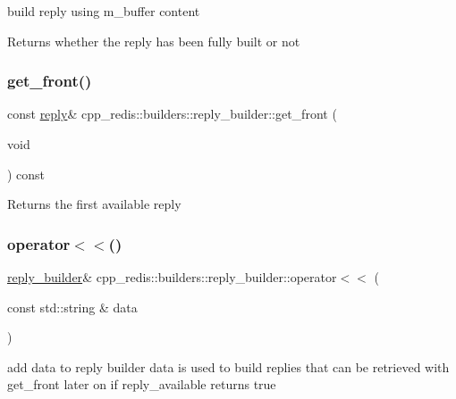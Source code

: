 build reply using m\+\_\+buffer content

\begin{DoxyReturn}{Returns}
whether the reply has been fully built or not 
\end{DoxyReturn}
\mbox{\label{classcpp__redis_1_1builders_1_1reply__builder_ac37b532920ace20e24a40ea1c61940fe}} 
\subsubsection{\texorpdfstring{get\+\_\+front()}{get\_front()}}
{\footnotesize\ttfamily const \hyperlink{classcpp__redis_1_1reply}{reply}\& cpp\+\_\+redis\+::builders\+::reply\+\_\+builder\+::get\+\_\+front (\begin{DoxyParamCaption}\item[{void}]{ }\end{DoxyParamCaption}) const}

\begin{DoxyReturn}{Returns}
the first available reply 
\end{DoxyReturn}
\mbox{\label{classcpp__redis_1_1builders_1_1reply__builder_a5f675e309a7a6002d582293c6410c967}} 
\subsubsection{\texorpdfstring{operator$<$$<$()}{operator<<()}}
{\footnotesize\ttfamily \hyperlink{classcpp__redis_1_1builders_1_1reply__builder}{reply\+\_\+builder}\& cpp\+\_\+redis\+::builders\+::reply\+\_\+builder\+::operator$<$$<$ (\begin{DoxyParamCaption}\item[{const std\+::string \&}]{data }\end{DoxyParamCaption})}

add data to reply builder data is used to build replies that can be retrieved with get\+\_\+front later on if reply\+\_\+available returns true


